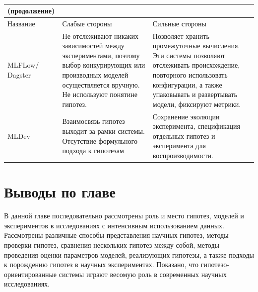 \begin{table} [ht]%
	\caption*{}%
    \setlength\extrarowheight{0pt} %
    \setlength{\tymin}{2.5cm}%
	\begin{tabulary}{\textwidth}{@{}>{\zz}L >{\zz}L >{\zz}L@{}}%
        \toprule     %
         \scriptsize (продолжение) & & %
        \\
        \midrule
    	Название &
    	Слабые стороны &
    	Сильные стороны	\\
        \midrule %

        MLFLow/ Dagster &
        Не отслеживают никаких зависимостей между экспериментами, поэтому выбор конкурирующих или производных моделей 
        осуществляется вручную. Не используют понятине гипотез.
        &
        Позволяет хранить промежуточные вычисления. Эти системы позволяют отслеживать происхождение, повторного 
        использовать конфигурации, а также упаковывать и развертывать модели, фиксируют метрики.
        \\
        \midrule
        MLDev &
        Взаимосвязь гипотез выходит за рамки системы. Отсутствие формульного подхода к гипотезам &
        Сохранение эколюции эксперимента, спецификация отдельных гипотез и эксперимента для воспроизводимости.
        \\
        \bottomrule %
	\end{tabulary}%
\end{table}

\clearpage
\section{Выводы по главе}\label{sect1_4}
В данной главе последовательно рассмотрены роль и место гипотез, моделей и экспериментов в исследованиях с 
интенсивным использованием данных. Рассмотрены различные способы представления научных гипотез, методы проверки гипотез,
сравнения нескольких гипотез между собой, методы проведения оценки параметров моделей, реализующих гипотезы, а также 
подходы к порождению гипотез в научных экспериментах. Показано, что гипотезо-ориентированные системы играют весомую 
роль в современных научных исследованиях.

